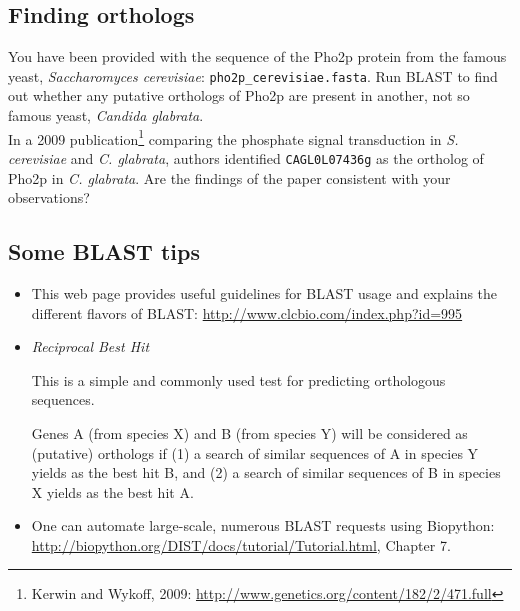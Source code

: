 \documentclass[a4paper,11pt]{article}
\begin{document}
\subsection{Finding orthologs}

You have been provided with the sequence of the Pho2p protein from the famous yeast, \emph{Saccharomyces cerevisiae}: \texttt{pho2p\_cerevisiae.fasta}. Run BLAST to find out whether any putative orthologs of Pho2p are present in another, not so famous yeast, \emph{Candida glabrata}.\\

In a 2009 publication\footnote{Kerwin and Wykoff, 2009: \url{http://www.genetics.org/content/182/2/471.full}} comparing the phosphate signal transduction in \emph{S. cerevisiae} and \emph{C. glabrata}, authors identified \texttt{CAGL0L07436g} as the ortholog of Pho2p in \emph{C. glabrata}. Are the findings of the paper consistent with your observations?

\subsection{Some BLAST tips}

\begin{itemize}
\item This web page provides useful guidelines for BLAST usage and explains the different flavors of BLAST:
\url{http://www.clcbio.com/index.php?id=995}

\item \emph{Reciprocal Best Hit}

This is a simple and commonly used test for predicting orthologous sequences.

Genes A (from species X) and B (from species Y) will be considered as (putative) orthologs if (1) a search of similar sequences of A in species Y yields as the best hit B, and (2) a search of similar sequences of B in species X yields as the best hit A.

\item One can automate large-scale, numerous BLAST requests using Biopython: \\
	\url{http://biopython.org/DIST/docs/tutorial/Tutorial.html}, Chapter 7.
\end{itemize}
\end{document}
